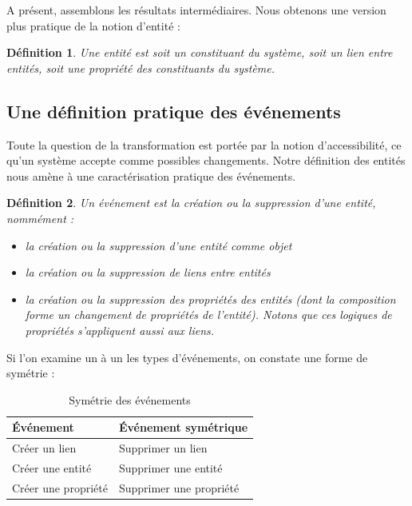 \documentclass{report}
\newtheorem{definition}{Définition}[section]
\begin{document}
		
		A présent, assemblons les résultats intermédiaires. Nous obtenons une version plus pratique de la notion d'entité : 
		
		\begin{definition}
			Une entité est soit un constituant du système, soit un lien entre entités, soit une propriété des constituants du système. 
		\end{definition}
	
	\subsection*{Une définition pratique des événements}
	
		Toute la question de la transformation est portée par la notion d'accessibilité, ce qu'un système accepte comme possibles changements. Notre définition des entités nous amène à une caractérisation pratique des événements. 
		
		\begin{definition}
			Un événement est la création ou la suppression d'une entité, nommément : 
			\begin{itemize}
				\item la création ou la suppression d'une entité comme objet
				\item la création ou la suppression de liens entre entités
				\item la création ou la suppression des propriétés des entités (dont la composition forme un changement de propriétés de l'entité). Notons que ces logiques de propriétés s'appliquent aussi aux liens. 
			\end{itemize}
		\end{definition}
		
				
		Si l'on examine un à un les types d'événements, on constate une forme de symétrie : 
		
		\begin{table}[H]
			\centering
			\begin{tabular}{|l|l|}
				\hline 
				\textbf{Événement} & \textbf{Événement symétrique} \\
				\hline 
				Créer un lien & Supprimer un lien \\
				\hline 
				Créer une entité & Supprimer une entité \\
				\hline 
				Créer une propriété & Supprimer une propriété \\
				\hline 
			\end{tabular}
			\caption{Symétrie des événements}
		\end{table}
		
\end{document}

